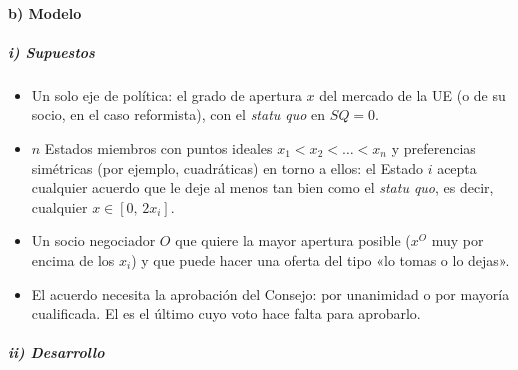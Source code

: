 \documentclass[11pt]{article}
\begin{document}
\paragraph{b) Modelo}

\subparagraph{i) Supuestos}

\begin{itemize}
\item Un solo eje de política: el grado de apertura $x$ del mercado de la UE (o de su socio, en el caso reformista), con el \emph{statu quo} en $\mathit{SQ}=0$.
\item $n$ Estados miembros con puntos ideales $x_1<x_2<\dots<x_n$ y preferencias simétricas (por ejemplo, cuadráticas) en torno a ellos: el Estado $i$ acepta cualquier acuerdo que le deje al menos tan bien como el \emph{statu quo}, es decir, cualquier $x\in[0,\,2x_i]$.
\item Un socio negociador $O$ que quiere la mayor apertura posible ($x^{O}$ muy por encima de los $x_i$) y que puede hacer una oferta del tipo «lo tomas o lo dejas».
\item El acuerdo necesita la aprobación del Consejo: por unanimidad o por mayoría cualificada. El  es el último cuyo voto hace falta para aprobarlo.
\end{itemize}

\subparagraph{ii) Desarrollo}
\end{document}
